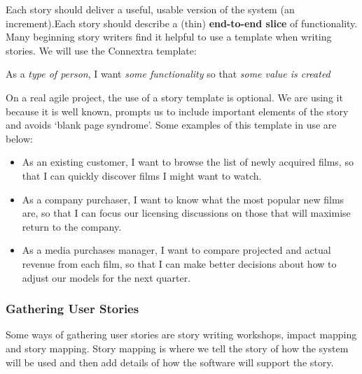 \documentclass{article}
\begin{document}
Each story should deliver a useful, usable version of the system (an increment).Each story should describe a (thin) \textbf{end-to-end slice} of functionality. Many beginning story writers find it helpful to use a template when writing stories. We will use the Connextra template:
\begin{center}
	As a \textit{type of person}, I want \textit{some functionality} so that \textit{some value is created}
\end{center}
On a real agile project, the use of a story template is optional. We are using it because it is well known, prompts us to include important elements of the story and avoids `blank page syndrome'. Some examples of this template in use are below:
\begin{itemize}
	\item As an existing customer, I want to browse the list of newly acquired films, so that I can quickly discover films I might want to watch.
	\item As a company purchaser, I want to know what the most popular new films are, so that I can focus our licensing discussions on those that will maximise return to the company.
	\item As a media purchases manager, I want to compare projected and actual revenue from each film, so that I can make better decisions about how to adjust our models for the next quarter.
\end{itemize}

\subsubsection{Gathering User Stories}
Some ways of gathering user stories are story writing workshops, impact mapping and story mapping. Story mapping is where we tell the story of how the system will be used and then add details of how the software will support the story.
\end{document}
